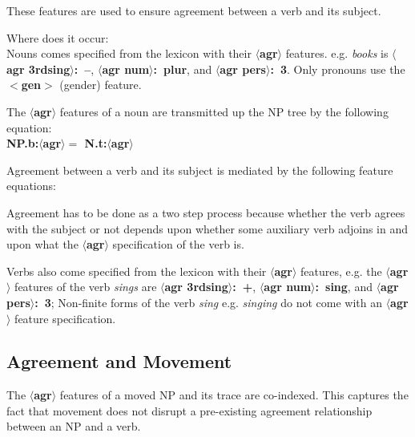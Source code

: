 These features are used to ensure agreement between a verb and its subject. 
 
Where does it occur:\\ Nouns comes specified from the lexicon with 
their {\bf $\langle$agr$\rangle$} features. e.g. {\em books} is {\bf $\langle$agr 3rdsing$\rangle$:~--}, {\bf $\langle$agr num$\rangle$:~plur}, and {\bf $\langle$agr pers$\rangle$:~3}. Only pronouns use the 
{\bf $<$gen$>$} (gender) feature. 
 
The {\bf $\langle$agr$\rangle$} features of a noun are transmitted up the 
NP tree by the following equation:\\ 
{\bf NP.b:$\langle$agr$\rangle =$ N.t:$\langle$agr$\rangle$} 
 
Agreement between a verb and its subject is mediated by the following feature 
equations: 
 
\beginsentences
{}\label{ex:192} 
\endsentences

 
 
\beginsentences
{}\label{ex:193} 
\endsentences

 
Agreement has to be done as a two step process because whether the 
verb agrees with the subject or not depends upon whether some auxiliary verb 
adjoins in and upon what the {\bf $\langle$agr$\rangle$} specification of 
the verb is. 
 
Verbs also come specified from the lexicon with their {\bf $\langle$agr$\rangle$} features, e.g. the {\bf $\langle$agr$\rangle$} 
features of the verb {\em sings} are {\bf $\langle$agr 3rdsing$\rangle$:~+}, {\bf $\langle$agr num$\rangle$:~sing}, and {\bf $\langle$agr pers$\rangle$:~3}; Non-finite forms of the verb {\em sing} e.g. {\em singing} do not come with an {\bf $\langle$agr$\rangle$} feature specification. 
 
\subsection{Agreement and Movement} 
The {\bf $\langle$agr$\rangle$} features of a moved NP and its trace 
are co-indexed. This captures the fact that movement does not disrupt 
a pre-existing agreement relationship between an NP and a verb. 
 
\beginsentences
{}\label{ex:194} 
\endsentences


